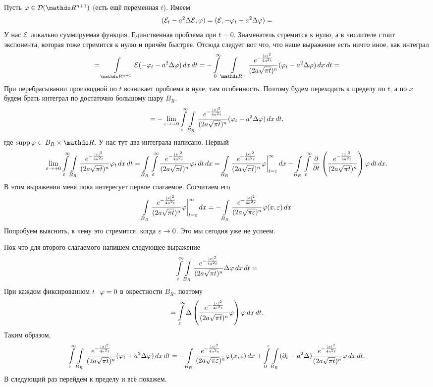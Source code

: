 \begin{Proof}
  Пусть $\phi\in\D(\R^{n+1})$ (есть ещё переменная $t$). Имеем
\[
   (\mathcal E_t - a^2\Delta\mathcal E,\varphi) = (\mathcal E,-\varphi_t-a^2\Delta\varphi) = 
\]
У нас $\mathcal E$ локально суммируемая функция. Единственная проблема при $t=0$. Знаменатель стремится к нулю, а в числителе стоит экспонента, которая тоже стремится к нулю и причём быстрее. Отсюда следует вот что, что наше выражение есть ничто иное, как интеграл
\[
  = \Gint{\R^{n+1}} \E(-\phi_t-a^2\Delta\phi)\,dx\,dt =
    - \int\limits_0^\infty\Gint{\R^n}\frac{e^{-\frac{|x|^2}{4a^2t}}}{(2a\sqrt{\pi t})^n}(\phi_t-a^2\Delta\phi)\,dx\,dt=
\]
При перебрасывании производной по $t$ возникает проблема в нуле, там особенность. Поэтому будем переходить к пределу по $t$, а по $x$ будем брать интеграл по достаточно большому шару $B_R$.
\[
  = - \lim\limits_{\varepsilon\rightarrow+0}\int\limits_\varepsilon^\infty\int\limits_{B_R}\frac{e^{-\frac{|x|^2}{4a^2t}}}{(2a\sqrt{\pi t})^n}(\varphi_t-a^2\Delta\varphi)\,dx\,dt,
\]
где $\supp\phi\subset B_R\times\R$.
У нас тут два интеграла написано. Первый
\[
  \lim\limits_{\varepsilon\rightarrow+0}\int\limits_\varepsilon^\infty\int\limits_{B_R}\frac{e^{-\frac{|x|^2}{4a^2t}}}{(2a\sqrt{\pi t})^n}\varphi_t\,dx\,dt = 
    \int\limits_{B_R}\int\limits_\varepsilon^\infty \frac{e^{-\frac{|x|^2}{4a^2t}}}{(2a\sqrt{\pi t})^n}\varphi_t\,dt\,dx = 
  \int\limits_{B_R} \frac{e^{-\frac{|x|^2}{4a^2t}}}{(2a\sqrt{\pi t})^n}\varphi\bigg|_{t=\varepsilon}^\infty\,dx - 
    \int\limits_{B_R}\int\limits_\varepsilon^\infty\frac{\partial }{\partial t}\left(\frac{e^{-\frac{|x|^2}{4a^2t}}}{(2a\sqrt{\pi t})^n}\right)\varphi\,dt\,dx.
\]
В этом выражении меня пока интересует первое слагаемое. Сосчитаем его
\[
  \int\limits_{B_R}\frac{e^{-\frac{|x|^2}{4a^2t}}}{(2a\sqrt{\pi t})^n}\varphi\bigg|_{t=\varepsilon}^\infty\,dx  = 
  -\int\limits_{B_R}\frac{e^{-\frac{|x|^2}{4a^2\varepsilon}}}{(2a\sqrt{\pi \varepsilon})^n}\varphi(x,\varepsilon)\,dx
\]
Попробуем выяснить, к чему это стремится, когда $\varepsilon\rightarrow0$. Это мы сегодня уже не успеем.

Пок что для второго слагаемого напишем следующее выражение
\[
  \int\limits_\varepsilon^\infty\int\limits_{B_R}\frac{e^{-\frac{|x|^2}{4a^2t}}}{(2a\sqrt{\pi t})^n}\Delta\varphi\,dx\,dt = 
\]
При каждом фиксированном $t\pau \phi=0$ в окрестности $B_R$, поэтому
\[
  = \int\limits_\varepsilon^\infty \Delta\left(\frac{e^{-\frac{|x|^2}{4a^2t}}}{(2a\sqrt{\pi t})^n}\varphi\right)\varphi\,dx\,dt.
\]
Таким образом,
\[
  \int\limits_\varepsilon^\infty \int\limits_{B_R}\frac{e^{-\frac{|x|^2}{4a^2t}}}{(2a\sqrt{\pi t})^n}(\varphi_t + a^2\Delta\varphi)\,dx\,dt = 
  - \int\limits_{B_R}\frac{e^{-\frac{|x|^2}{4a^2\varepsilon}}}{(2a\sqrt{\pi \varepsilon})^n}\varphi(x,\varepsilon)\,dx + 
    \int\limits_0^\varepsilon\int\limits_{B_R}(\partial_t-a^2\Delta) \frac{e^{-\frac{|x|^2}{4a^2t}}}{(2a\sqrt{\pi t})^n}\varphi\,dx\,dt.
\]
В следующий раз перейдём к пределу и всё покажем.
\end{Proof}

